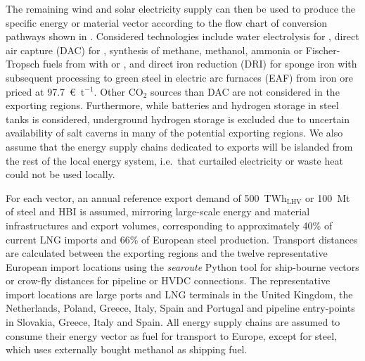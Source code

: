 
The remaining wind and solar electricity supply can then be used to produce the
specific energy or material vector according to the flow chart of conversion
pathways shown in . Considered technologies
include water electrolysis for , direct air capture (DAC) for ,
synthesis of methane, methanol, ammonia or Fischer-Tropsch fuels from 
with  or , and  direct iron reduction (DRI) for sponge
iron with subsequent processing to green steel in electric arc furnaces (EAF)
from iron ore priced at
97.7~\euro{}~t$^{-1}$.\cite{missionpossiblepartnershipSteelSectorTransition2022}
Other CO$_2$ sources than DAC are not considered in the exporting regions.
Furthermore, while batteries and hydrogen storage in steel tanks is considered,
underground hydrogen storage is excluded due to uncertain availability of salt
caverns in many of the potential exporting
regions.\cite{hevinUndergroundStorageHydrogen2019,hydrogentcp-task42UndergroundHydrogenStorage2023}
We also assume that the energy supply chains dedicated to exports will be
islanded from the rest of the local energy system, i.e.~that curtailed
electricity or waste heat could not be used locally.

For each vector, an annual reference export demand of 500~TWh$_\text{LHV}$ or
100~Mt of steel and HBI is assumed, mirroring large-scale energy and material
infrastructures and export volumes, corresponding to approximately 40\% of
current LNG
imports\cite{instituteforenergyeconomicsandfinancialanalysisEuropeanLNG2023} and
66\% of European steel
production.\cite{eurofer-theeuropeansteelassociationEuropeanSteel2023} Transport
distances are calculated between the exporting regions and the twelve
representative European import locations using the \textit{searoute} Python tool
for ship-bourne vectors or crow-fly distances for pipeline or HVDC connections.
The representative import locations are large ports and LNG terminals in the
United Kingdom, the Netherlands, Poland, Greece, Italy, Spain and Portugal and
pipeline entry-points in Slovakia, Greece, Italy and Spain. All energy supply
chains are assumed to consume their energy vector as fuel for transport to
Europe, except for steel, which uses externally bought methanol as shipping
fuel.


